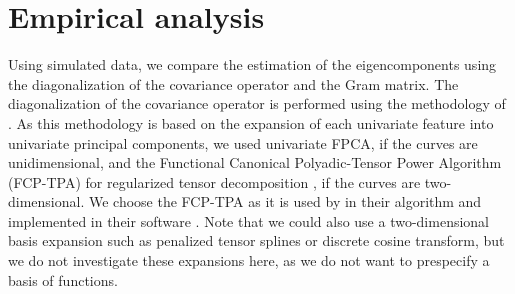 \section{Empirical analysis} %
\label{sec:empirical_analysis}

Using simulated data, we compare the estimation of the eigencomponents using the diagonalization of the covariance operator and the Gram matrix. The diagonalization of the covariance operator is performed using the methodology of \cite{happMultivariateFunctionalPrincipal2018a}. As this methodology is based on the expansion of each univariate feature into univariate principal components, we used univariate FPCA, if the curves are unidimensional, and the Functional Canonical Polyadic-Tensor Power Algorithm (FCP-TPA) for regularized tensor decomposition \citep{allenMultiwayFunctionalPrincipal2013a}, if the curves are two-dimensional. We choose the FCP-TPA as it is used by \cite{happMultivariateFunctionalPrincipal2018a} in their algorithm and implemented in their software \citep{happ-kurzObjectOrientedSoftwareFunctional2020}. Note that we could also use a two-dimensional basis expansion such as penalized tensor splines or discrete cosine transform, but we do not investigate these expansions here, as we do not want to prespecify a basis of functions.

